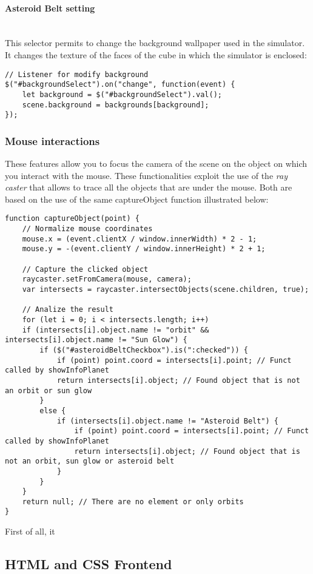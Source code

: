 \documentclass{article}
\begin{document}
\paragraph{Asteroid Belt setting}\mbox{}\\
This selector permits to change the background wallpaper used in the simulator. It changes the texture of the faces of the cube in which the simulator is enclosed:
\begin{lstlisting}
// Listener for modify background
$("#backgroundSelect").on("change", function(event) {
	let background = $("#backgroundSelect").val();
	scene.background = backgrounds[background];
});
\end{lstlisting}

\subsubsection{Mouse interactions}
These features allow you to focus the camera of the scene on the object on which you interact with the mouse. These functionalities exploit the use of the \textit{ray caster} that allows to trace all the objects that are under the mouse. Both are based on the use of the same captureObject function illustrated below:
\begin{lstlisting}
function captureObject(point) {
	// Normalize mouse coordinates
	mouse.x = (event.clientX / window.innerWidth) * 2 - 1;
	mouse.y = -(event.clientY / window.innerHeight) * 2 + 1;
	
	// Capture the clicked object
	raycaster.setFromCamera(mouse, camera);
	var intersects = raycaster.intersectObjects(scene.children, true);
	
	// Analize the result
	for (let i = 0; i < intersects.length; i++)
	if (intersects[i].object.name != "orbit" && intersects[i].object.name != "Sun Glow") {
		if ($("#asteroidBeltCheckbox").is(":checked")) {
			if (point) point.coord = intersects[i].point; // Funct called by showInfoPlanet
			return intersects[i].object; // Found object that is not an orbit or sun glow
		}
		else {
			if (intersects[i].object.name != "Asteroid Belt") {
				if (point) point.coord = intersects[i].point; // Funct called by showInfoPlanet
				return intersects[i].object; // Found object that is not an orbit, sun glow or asteroid belt
			}
		}
	}
	return null; // There are no element or only orbits
}
\end{lstlisting}
First of all, it 


\subsection{HTML and CSS Frontend}
\end{document}
